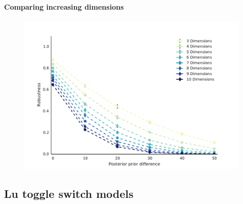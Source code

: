 \paragraph{Comparing increasing dimensions}
\begin{figure}[htbp]
\centering
\includegraphics[scale=0.6]{chapterStabilityFinder/images/robustness_s_uniform_dimens.pdf}
\caption[LoF caption]{}
\label{}
\end{figure}
\clearpage


\subsection{Lu toggle switch models}

